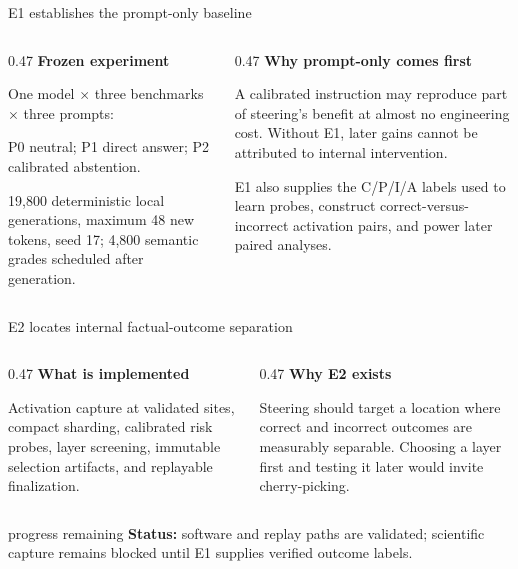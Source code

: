 \documentclass[aspectratio=169,11pt]{beamer}
\begin{document}
\begin{frame}{E1 establishes the prompt-only baseline}
  \small
  \begin{columns}[T,onlytextwidth]
    \begin{column}{0.47\textwidth}
      \textbf{Frozen experiment}\par\vspace{0.15cm}
      One model $\times$ three benchmarks $\times$ three prompts:\par
      P0 neutral; P1 direct answer; P2 calibrated abstention.\par\vspace{0.35cm}
      19,800 deterministic local generations, maximum 48 new tokens, seed 17; 4,800 semantic grades scheduled after generation.
    \end{column}
    \begin{column}{0.47\textwidth}
      \textbf{Why prompt-only comes first}\par\vspace{0.15cm}
      A calibrated instruction may reproduce part of steering's benefit at almost no engineering cost. Without E1, later gains cannot be attributed to internal intervention.\par\vspace{0.35cm}
      E1 also supplies the C/P/I/A labels used to learn probes, construct correct-versus-incorrect activation pairs, and power later paired analyses.
    \end{column}
  \end{columns}
\end{frame}


\begin{frame}{E2 locates internal factual-outcome separation}
  \small
  \begin{columns}[T,onlytextwidth]
    \begin{column}{0.47\textwidth}
      \textbf{What is implemented}\par\vspace{0.15cm}
      Activation capture at validated sites, compact sharding, calibrated risk probes, layer screening, immutable selection artifacts, and replayable finalization.
    \end{column}
    \begin{column}{0.47\textwidth}
      \textbf{Why E2 exists}\par\vspace{0.15cm}
      Steering should target a location where correct and incorrect outcomes are measurably separable. Choosing a layer first and testing it later would invite cherry-picking.
    \end{column}
  \end{columns}
  \vspace{0.35cm}
  \begin{beamercolorbox}[rounded=true,sep=0.4em]{progress remaining}
    \textbf{Status:} software and replay paths are validated; scientific capture remains blocked until E1 supplies verified outcome labels.
  \end{beamercolorbox}
\end{frame}
\end{document}
